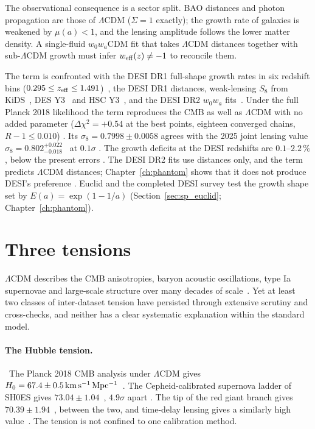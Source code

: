 The observational consequence is a sector split. BAO distances and photon propagation are those of $\Lambda$CDM ($\Sigma=1$ exactly); the growth
rate of galaxies is weakened by $\mu(a)<1$, and the lensing amplitude follows the lower matter density. A single-fluid $w_0w_a$CDM fit that takes
$\Lambda$CDM distances together with sub-$\Lambda$CDM growth must infer $w_{\rm eff}(z)\neq-1$ to reconcile them.

The term is confronted with the DESI DR1 full-shape growth rates in six redshift bins ($0.295\le z_{\rm eff}\le1.491$)~\cite{DESI2024V}, the DESI DR1
distances, weak-lensing $S_8$ from KiDS~\cite{Heymans2021,Asgari2021,Wright2025,Stolzner2025}, DES Y3~\cite{DESY3} and HSC Y3~\cite{HSCY3Dalal}, and the
DESI DR2 $w_0w_a$ fits~\cite{DESI2025}. Under the full Planck 2018 likelihood the term reproduces the CMB as well as $\Lambda$CDM with no added parameter
($\Delta\chi^2=+0.54$ at the best points, eighteen converged chains, $R-1\le0.010$) \measured. Its $\sigma_8=0.7998\pm0.0058$ agrees with the 2025 joint
lensing value $\sigma_8=0.802^{+0.022}_{-0.018}$~\cite{Stolzner2025} at $0.1\sigma$ \calc. The growth deficits at the DESI redshifts are $0.1$--$2.2\,\%$,
below the present errors \calc. The DESI DR2 fits use distances only, and the term predicts $\Lambda$CDM distances; Chapter~\ref{ch:phantom} shows
that it does not produce DESI's preference \calc. Euclid and the completed DESI survey test the growth shape set by $E(a)=\exp(1-1/a)$
(Section~\ref{sec:sp_euclid}; Chapter~\ref{ch:phantom}).

\section{Three tensions}
$\Lambda$CDM describes the CMB anisotropies, baryon acoustic oscillations, type Ia supernovae and large-scale structure over many decades of
scale~\cite{Planck2018VI}. Yet at least two classes of inter-dataset tension have persisted through extensive scrutiny and cross-checks, and neither
has a clear systematic explanation within the standard model. \interp

\paragraph{The Hubble tension.} \observed\ The Planck 2018 CMB analysis under $\Lambda$CDM gives $H_0=67.4\pm0.5\,{\rm km\,s^{-1}\,Mpc^{-1}}$~\cite{Planck2018VI}. The
Cepheid-calibrated supernova ladder of SH0ES gives $73.04\pm1.04$~\cite{Riess2022}, $4.9\sigma$ apart \calc. The tip of the red giant branch gives
$70.39\pm1.94$~\cite{Freedman2025}, between the two, and time-delay lensing gives a similarly high value~\cite{Wong2020}. The tension is not confined to
one calibration method. \interp

